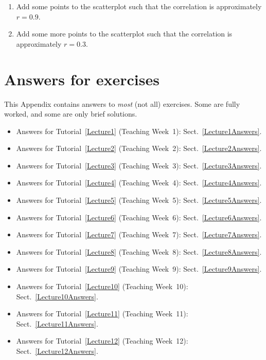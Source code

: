 \documentclass[
  11pt,
  a4paper,
  krantz2]{krantz}
\providecommand{\tightlist}{%
  \setlength{\itemsep}{0pt}\setlength{\parskip}{0pt}}
\newlength{\greyboxheight}
\newcommand{\setgreyboxheight}[1]{%
  \setlength{\greyboxheight}{2.3\baselineskip * #1}%
}
\newenvironment{greybox}[1]{%
  \nopagebreak
  \setgreyboxheight{#1}%
  \begin{tcolorbox}[
    colframe=gray!30!black,
    boxrule=2pt,
    width=\linewidth,
    height=\greyboxheight,
    valign=center,
    colback=white,
    left=4pt,
    right=4pt, 
    top=4pt, 
    bottom=4pt,
    before skip=4pt,
    after skip=4pt
  ]
\vspace*{\greyboxheight} %
}{%
  \end{tcolorbox}
  \goodbreak
}
\newcommand{\greyboxlines}[1]{\noindent\begin{greybox}{#1}\end{greybox}}
\begin{document}
\begin{enumerate}
\def\labelenumi{\arabic{enumi}.}
\tightlist
\item
  Add some points to the scatterplot such that the correlation is approximately \(r = 0.9\).
  \greyboxlines{5}
\item
  Add some more points to the scatterplot such that the correlation is approximately \(r = 0.3\).
  \greyboxlines{5}
\end{enumerate}

\appendix {}


\chapter{Answers for exercises}\label{OptionalAnswers}

This Appendix contains answers to \emph{most} (not all) exercises.
Some are fully worked, and some are only brief solutions.

\begin{itemize}
\tightlist
\item
  Answers for Tutorial~\ref{Lecture1} (Teaching Week~1): Sect.~\ref{Lecture1Answers}.
\item
  Answers for Tutorial~\ref{Lecture2} (Teaching Week~2): Sect.~\ref{Lecture2Answers}.
\item
  Answers for Tutorial~\ref{Lecture3} (Teaching Week~3): Sect.~\ref{Lecture3Answers}.
\item
  Answers for Tutorial~\ref{Lecture4} (Teaching Week~4): Sect.~\ref{Lecture4Answers}.
\item
  Answers for Tutorial~\ref{Lecture5} (Teaching Week~5): Sect.~\ref{Lecture5Answers}.
\item
  Answers for Tutorial~\ref{Lecture6} (Teaching Week~6): Sect.~\ref{Lecture6Answers}.
\item
  Answers for Tutorial~\ref{Lecture7} (Teaching Week~7): Sect.~\ref{Lecture7Answers}.
\item
  Answers for Tutorial~\ref{Lecture8} (Teaching Week~8): Sect.~\ref{Lecture8Answers}.
\item
  Answers for Tutorial~\ref{Lecture9} (Teaching Week~9): Sect.~\ref{Lecture9Answers}.
\item
  Answers for Tutorial~\ref{Lecture10} (Teaching Week~10): Sect.~\ref{Lecture10Answers}.
\item
  Answers for Tutorial~\ref{Lecture11} (Teaching Week~11): Sect.~\ref{Lecture11Answers}.
\item
  Answers for Tutorial~\ref{Lecture12} (Teaching Week~12): Sect.~\ref{Lecture12Answers}.
\end{itemize}
\end{document}
